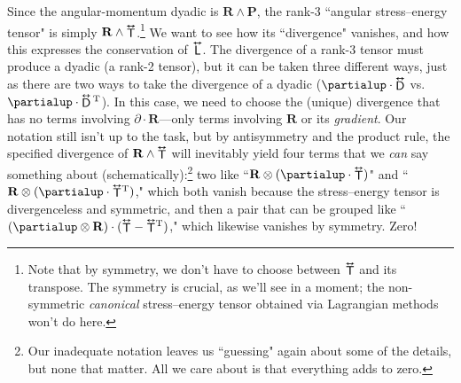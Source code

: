 \documentclass[12pt]{article}
\renewcommand{\vv}[1]{\mathbf{#1}}
\newcommand{\tightoverset}[2]{%
  \mathop{#2}\limits^{\vbox to -.5ex{\kern-0.75ex\hbox{$#1$}\vss}}}
\newcommand{\inlinedy}[1]{\tightoverset{\text{\tiny$\bm\leftrightarrow$}}{#1}}
\begin{document}
Since the angular-momentum dyadic is $\vv R \wedge \vv P$, the rank-3 ``angular stress--energy tensor" is simply $\vv R \wedge {\inlinedy{\mathsf{T}}} $.\footnote{Note that by symmetry, we don't have to choose between ${\inlinedy{\mathsf{T}}} $ and its transpose. The symmetry is crucial, as we'll see in a moment; the non-symmetric \emph{canonical} stress--energy tensor obtained via Lagrangian methods won't do here.} We want to see how its ``divergence" vanishes, and how this expresses the conservation of $\inlinedy{\mathsf{L}}$. The divergence of a rank-3 tensor must produce a dyadic (a rank-2 tensor), but it can be taken three different ways, just as there are two ways to take the divergence of a dyadic (${\partialup \cdot \inlinedy{\mathsf{D}}}$ vs. $\partialup \cdot \inlinedy{\mathsf{D}} {}^{\mathrm{T}}$). In this case, we need to choose the (unique) divergence that has no terms involving $\partialup \cdot \vv R$---only terms involving $\vv R$ or its \emph{gradient}. Our notation still isn't up to the task, but by antisymmetry and the product rule, the specified divergence of $\vv R \wedge {\inlinedy{\mathsf{T}}} $ will inevitably yield four terms that we \emph{can} say something about (schematically):\footnote{Our inadequate notation leaves us ``guessing" again about some of the details, but none that matter. All we care about is that everything adds to zero.} two like ``$\vv R \otimes (\partialup \cdot {\inlinedy{\mathsf{T}}} )$" and ``$\vv R \otimes (\partialup \cdot {\inlinedy{\mathsf{T}}} {}^{\mathrm{T}} )$," which both vanish because the stress--energy tensor is divergenceless and symmetric, and then a pair that can be grouped like ``$(\partialup \otimes \vv R) \cdot ({\inlinedy{\mathsf{T}}} - {\inlinedy{\mathsf{T}}} {}^{\mathrm{T}} )$," which likewise vanishes by symmetry. Zero!
\end{document}
